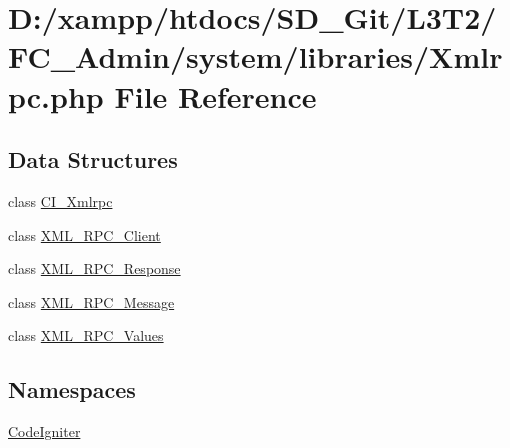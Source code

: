 \hypertarget{_admin_2system_2libraries_2_xmlrpc_8php}{}\section{D\+:/xampp/htdocs/\+S\+D\+\_\+\+Git/\+L3\+T2/\+F\+C\+\_\+\+Admin/system/libraries/\+Xmlrpc.php File Reference}
\label{_admin_2system_2libraries_2_xmlrpc_8php}
\subsection*{Data Structures}
\begin{DoxyCompactItemize}
\item 
class \hyperlink{class_c_i___xmlrpc}{C\+I\+\_\+\+Xmlrpc}
\item 
class \hyperlink{class_x_m_l___r_p_c___client}{X\+M\+L\+\_\+\+R\+P\+C\+\_\+\+Client}
\item 
class \hyperlink{class_x_m_l___r_p_c___response}{X\+M\+L\+\_\+\+R\+P\+C\+\_\+\+Response}
\item 
class \hyperlink{class_x_m_l___r_p_c___message}{X\+M\+L\+\_\+\+R\+P\+C\+\_\+\+Message}
\item 
class \hyperlink{class_x_m_l___r_p_c___values}{X\+M\+L\+\_\+\+R\+P\+C\+\_\+\+Values}
\end{DoxyCompactItemize}
\subsection*{Namespaces}
\begin{DoxyCompactItemize}
\item 
 \hyperlink{namespace_code_igniter}{Code\+Igniter}
\end{DoxyCompactItemize}
